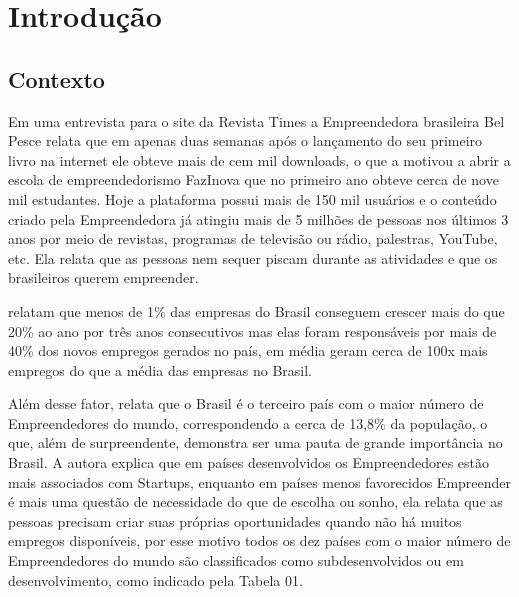 \chapter{Introdução}
\label{cap-introducao}

\section{Contexto}
\label{section:contexto}

Em uma entrevista para o site da Revista Times a Empreendedora brasileira Bel Pesce relata que em apenas duas semanas após o lançamento do seu primeiro livro na internet ele obteve mais de cem mil downloads, o que a motivou a abrir a escola de empreendedorismo FazInova que no primeiro ano obteve cerca de nove mil estudantes. Hoje a plataforma possui mais de 150 mil usuários e o conteúdo criado pela Empreendedora já atingiu mais de 5 milhões de pessoas nos últimos 3 anos por meio de revistas, programas de televisão ou rádio, palestras, YouTube, etc. Ela relata que as pessoas nem sequer piscam durante as atividades e que os brasileiros querem empreender.

 relatam que menos de 1\% das empresas do Brasil conseguem crescer mais do que 20\% ao ano por três anos consecutivos mas elas foram responsáveis por mais de 40\% dos novos empregos gerados no país, em média geram cerca de 100x mais empregos do que a média das empresas no Brasil. 

Além desse fator,  relata que o Brasil é o terceiro país com o maior número de Empreendedores do mundo, correspondendo a cerca de 13,8\% da população, o que, além de surpreendente, demonstra ser uma pauta de grande importância no Brasil. A autora explica que em países desenvolvidos os Empreendedores estão mais associados com Startups, enquanto em países menos favorecidos Empreender é mais uma questão de necessidade do que de escolha ou sonho, ela relata que as pessoas precisam criar suas próprias oportunidades quando não há muitos empregos disponíveis, por esse motivo todos os dez países com o maior número de Empreendedores do mundo são classificados como subdesenvolvidos ou em desenvolvimento, como indicado pela Tabela 01.

